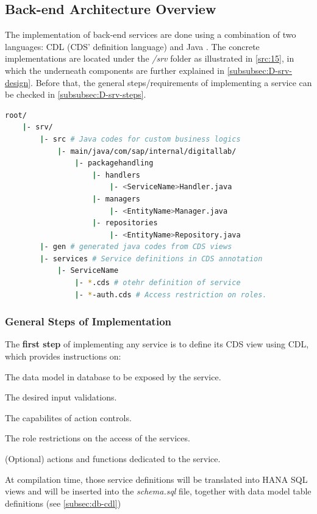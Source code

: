 \subsection{Back-end Architecture Overview}
\label{subsec:D-srv-back-arch}

The implementation of back-end services are done using a combination of two languages: CDL (CDS' definition language) \cite{cap-cds-lang} and Java \cite{java}. The concrete implementations are located under the \textit{/srv} folder as illustrated in \autoref{src:15}, in which the underneath components are further explained in \autoref{subsubsec:D-srv-design}. Before that, the general steps/requirements of implementing a service can be checked in \autoref{subsubsec:D-srv-steps}. 

\begin{lstlisting}[language={bash}]
root/
    |- srv/
        |- src # Java codes for custom business logics
            |- main/java/com/sap/internal/digitallab/
                |- packagehandling
                    |- handlers
                        |- <ServiceName>Handler.java
                    |- managers
                        |- <EntityName>Manager.java
                    |- repositories
                        |- <EntityName>Repository.java
        |- gen # generated java codes from CDS views
        |- services # Service definitions in CDS annotation
            |- ServiceName 
                |- *.cds # otehr definition of service
                |- *-auth.cds # Access restriction on roles.
\end{lstlisting}

\subsubsection{General Steps of Implementation}
\label{subsubsec:D-srv-steps}

The \textbf{first step} of implementing any service is to define its CDS view using CDL, which provides instructions on:
\begin{compactenum}
	\item The data model in database to be exposed by the service.
	\item The desired input validations.
	\item The capabilites of action controls.
    \item The role restrictions on the access of the services.
    \item (Optional) actions and functions dedicated to the service.
\end{compactenum}
At compilation time, those service definitions will be translated into HANA SQL views and will be inserted into the \textit{schema.sql} file, together with data model table definitions (see \autoref{subsec:db-cdl})
\bigskip

